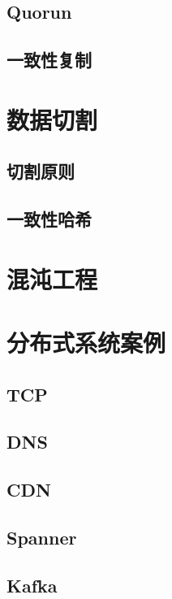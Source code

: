 \documentclass[reqno,heading=true,fontset=macnew]{ctexbook}
\begin{document}
\section{Quorun}

\section{一致性复制}


\chapter{数据切割}
\section{切割原则}

\section{一致性哈希}


\chapter{混沌工程}

\chapter{分布式系统案例}

\section{TCP}
\section{DNS}

\section{CDN}

\section{Spanner}

\section{Kafka}







{}



\printindex
\end{document}
